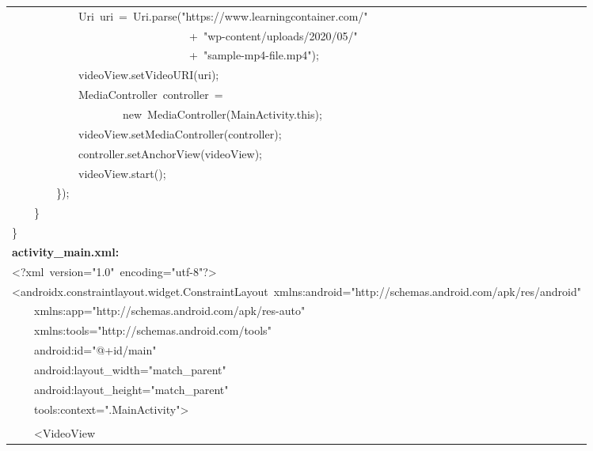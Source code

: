 \documentclass[a4paper,12pt]{article}
\begin{document}
\begin{longtable}{|p{}|}
{\ttfamily\small \ \ \ \ \ \ \ \ \ \ \ \ Uri\ uri\ =\ Uri.parse("https://www.learningcontainer.com/"} \\
{\ttfamily\small \ \ \ \ \ \ \ \ \ \ \ \ \ \ \ \ \ \ \ \ \ \ \ \ \ \ \ \ \ \ \ \ +\ "wp-content/uploads/2020/05/"} \\
{\ttfamily\small \ \ \ \ \ \ \ \ \ \ \ \ \ \ \ \ \ \ \ \ \ \ \ \ \ \ \ \ \ \ \ \ +\ "sample-mp4-file.mp4");} \\
{\ttfamily\small \ \ \ \ \ \ \ \ \ \ \ \ videoView.setVideoURI(uri);} \\
{\ttfamily\small \ \ \ \ \ \ \ \ \ \ \ \ MediaController\ controller\ =\ } \\
{\ttfamily\small \ \ \ \ \ \ \ \ \ \ \ \ \ \ \ \ \ \ \ \ new\ MediaController(MainActivity.this);} \\
{\ttfamily\small \ \ \ \ \ \ \ \ \ \ \ \ videoView.setMediaController(controller);} \\
{\ttfamily\small \ \ \ \ \ \ \ \ \ \ \ \ controller.setAnchorView(videoView);} \\
{\ttfamily\small \ \ \ \ \ \ \ \ \ \ \ \ videoView.start();} \\
{\ttfamily\small \ \ \ \ \ \ \ \ \});} \\
{\ttfamily\small \ \ \ \ \}} \\
{\ttfamily\small \}} \\
\hline
\rule{0pt}{13pt}\textbf{activity\_main.xml:} \\
\hline
{\ttfamily\small \textless{}?xml\ version="1.0"\ encoding="utf-8"?\textgreater{}} \\
{\ttfamily\small \textless{}androidx.constraintlayout.widget.ConstraintLayout\ xmlns:android="http://schemas.android.com/apk/res/android"} \\
{\ttfamily\small \ \ \ \ xmlns:app="http://schemas.android.com/apk/res-auto"} \\
{\ttfamily\small \ \ \ \ xmlns:tools="http://schemas.android.com/tools"} \\
{\ttfamily\small \ \ \ \ android:id="@+id/main"} \\
{\ttfamily\small \ \ \ \ android:layout\_width="match\_parent"} \\
{\ttfamily\small \ \ \ \ android:layout\_height="match\_parent"} \\
{\ttfamily\small \ \ \ \ tools:context=".MainActivity"\textgreater{}} \\
\strut \\
{\ttfamily\small \ \ \ \ \textless{}VideoView} \\

\end{longtable}
\end{document}
